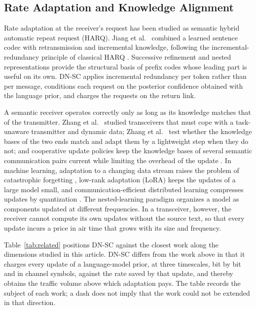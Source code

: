 \subsection{Rate Adaptation and Knowledge Alignment}
\label{sec:related-adapt}

Rate adaptation at the receiver's request has been studied as semantic hybrid automatic repeat request (HARQ). Jiang et al.\ \cite{jiang2022harq} combined a learned sentence codec with retransmission and incremental knowledge, following the incremental-redundancy principle of classical HARQ \cite{caire2001}. Successive refinement \cite{equitz1991} and nested representations \cite{kusupati2022} provide the structural basis of prefix codes whose leading part is useful on its own. DN-SC applies incremental redundancy per token rather than per message, conditions each request on the posterior confidence obtained with the language prior, and charges the requests on the return link.

A semantic receiver operates correctly only as long as its knowledge matches that of the transmitter. Zhang et al.\ \cite{zhang2023dynamic} studied transceivers that must cope with a task-unaware transmitter and dynamic data; Zhang et al.\ \cite{zhang2026kbident} test whether the knowledge bases of the two ends match and adapt them by a lightweight step when they do not; and cooperative update policies keep the knowledge bases of several semantic communication pairs current while limiting the overhead of the update \cite{zhang2026kbupdate}. In machine learning, adaptation to a changing data stream raises the problem of catastrophic forgetting \cite{kirkpatrick2017}, low-rank adaptation (LoRA) \cite{hu2022lora} keeps the updates of a large model small, and communication-efficient distributed learning compresses updates by quantization \cite{alistarh2017,mcmahan2017}. The nested-learning paradigm \cite{behrouz2025} organizes a model as components updated at different frequencies. In a transceiver, however, the receiver cannot compute its own updates without the source text, so that every update incurs a price in air time that grows with its size and frequency.

Table~\ref{tab:related} positions DN-SC against the closest work along the dimensions studied in this article. DN-SC differs from the work above in that it charges every update of a language-model prior, at three timescales, bit by bit and in channel symbols, against the rate saved by that update, and thereby obtains the traffic volume above which adaptation pays. The table records the subject of each work; a dash does not imply that the work could not be extended in that direction.

